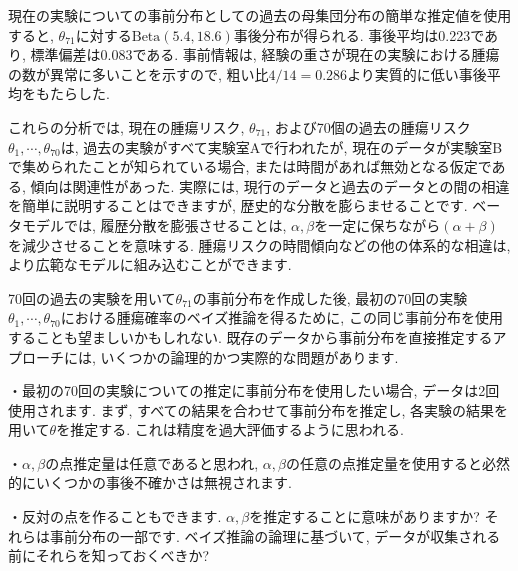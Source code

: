 \documentclass[10pt,dvipdfmx,a4]{beamer}
\begin{document}

\begin{frame}
現在の実験についての事前分布としての過去の母集団分布の簡単な推定値を使用すると, $\theta_{71}$に対する$\text{Beta}(5.4,18.6)$事後分布が得られる.
事後平均は0.223であり, 標準偏差は0.083である.
事前情報は, 経験の重さが現在の実験における腫瘍の数が異常に多いことを示すので, 粗い比$4/14 = 0.286$より実質的に低い事後平均をもたらした.

これらの分析では, 現在の腫瘍リスク, $\theta_{71}$, および70個の過去の腫瘍リスク$\theta_1,\cdots, \theta_{70}$は, 過去の実験がすべて実験室Aで行われたが, 現在のデータが実験室Bで集められたことが知られている場合, または時間があれば無効となる仮定である, 傾向は関連性があった.
実際には, 現行のデータと過去のデータとの間の相違を簡単に説明することはできますが, 歴史的な分散を膨らませることです.
ベータモデルでは, 履歴分散を膨張させることは, $\alpha,\beta$を一定に保ちながら$(\alpha+\beta)$を減少させることを意味する.
腫瘍リスクの時間傾向などの他の体系的な相違は, より広範なモデルに組み込むことができます.
\end{frame}


\begin{frame}
70回の過去の実験を用いて$\theta_{71}$の事前分布を作成した後, 最初の70回の実験$\theta_1,\cdots,\theta_{70}$における腫瘍確率のベイズ推論を得るために, この同じ事前分布を使用することも望ましいかもしれない.
既存のデータから事前分布を直接推定するアプローチには, いくつかの論理的かつ実際的な問題があります.

・最初の70回の実験についての推定に事前分布を使用したい場合, データは2回使用されます.
まず, すべての結果を合わせて事前分布を推定し, 各実験の結果を用いて$\theta$を推定する.
これは精度を過大評価するように思われる.

・$\alpha,\beta$の点推定量は任意であると思われ, $\alpha,\beta$の任意の点推定量を使用すると必然的にいくつかの事後不確かさは無視されます.

・反対の点を作ることもできます.
$\alpha,\beta$を推定することに意味がありますか?
それらは事前分布の一部です.
ベイズ推論の論理に基づいて,  データが収集される前にそれらを知っておくべきか?
\end{frame}

\end{document}
